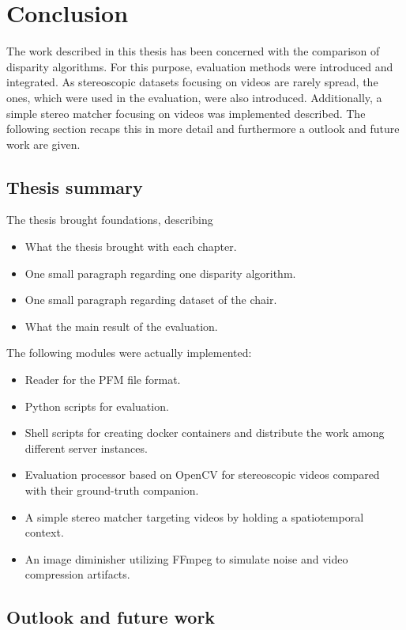 \chapter{Conclusion}
\label{chap:conclusion}

The work described in this thesis has been concerned with the comparison of disparity algorithms.
For this purpose, evaluation methods were introduced and integrated.
As stereoscopic datasets focusing on videos are rarely spread, the ones, which were used in the evaluation, were also introduced.
Additionally, a simple stereo matcher focusing on videos was implemented described.
The following section recaps this in more detail and furthermore a outlook and future work are given.

\section{Thesis summary}

The thesis brought foundations, describing 

\begin{itemize}
  \item What the thesis brought with each chapter.
  \item One small paragraph regarding one disparity algorithm.
  \item One small paragraph regarding dataset of the chair.
  \item What the main result of the evaluation.
\end{itemize}

\noindent The following modules were actually implemented:

\begin{itemize}
  \item Reader for the PFM file format.
  \item Python scripts for evaluation.
  \item Shell scripts for creating docker containers and distribute the work among different server instances.
  \item Evaluation processor based on OpenCV for stereoscopic videos compared with their ground-truth companion.
  \item A simple stereo matcher targeting videos by holding a spatiotemporal context.
  \item An image diminisher utilizing FFmpeg to simulate noise and video compression artifacts.
\end{itemize}

\section{Outlook and future work}

